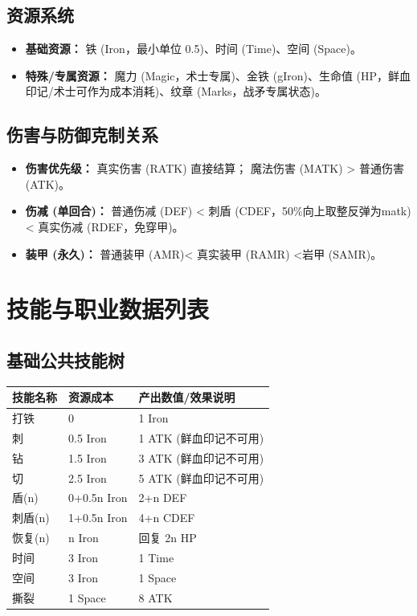 \documentclass[a4paper,10pt]{ctexart}
\begin{document}
\subsection{资源系统}
\begin{itemize}
    \item \textbf{基础资源：} 铁 (Iron，最小单位 0.5)、时间 (Time)、空间 (Space)。
    \item \textbf{特殊/专属资源：} 魔力 (Magic，术士专属)、金铁 (gIron)、生命值 (HP，鲜血印记/术士可作为成本消耗)、纹章 (Marks，战矛专属状态)。
\end{itemize}

\subsection{伤害与防御克制关系}
\begin{itemize}
    \item \textbf{伤害优先级：} 真实伤害 (RATK) 直接结算； 魔法伤害 (MATK) > 普通伤害 (ATK)。
    \item \textbf{伤减 (单回合)：} 普通伤减 (DEF) < 刺盾 (CDEF，50\%向上取整反弹为matk)< 真实伤减 (RDEF，免穿甲)。
    \item \textbf{装甲 (永久)：} 普通装甲 (AMR)< 真实装甲 (RAMR) <岩甲 (SAMR)。
\end{itemize}

\section{技能与职业数据列表}

\subsection{基础公共技能树}
\begin{table}[h]
\centering
\begin{tabular}{lll}
\toprule
技能名称 & 资源成本 & 产出数值/效果说明 \\
\midrule
打铁 & 0 & 1 Iron \\
刺 & 0.5 Iron & 1 ATK (鲜血印记不可用) \\
钻 & 1.5 Iron & 3 ATK (鲜血印记不可用) \\
切 & 2.5 Iron & 5 ATK (鲜血印记不可用) \\
盾(n) & 0+0.5n Iron & 2+n DEF \\
刺盾(n) & 1+0.5n Iron & 4+n CDEF \\
恢复(n) & n Iron & 回复 2n HP \\
时间 & 3 Iron & 1 Time \\
空间 & 3 Iron & 1 Space \\
撕裂 & 1 Space & 8 ATK \\
\bottomrule
\end{tabular}
\end{table}
\end{document}
